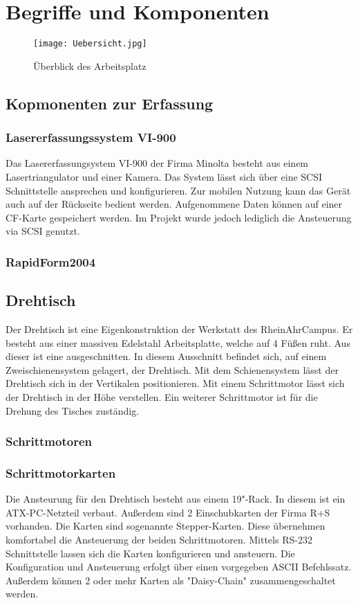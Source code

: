 \chapter{Begriffe und Komponenten}
\label{cha:Begriffe}
\begin{figure}[htb]
\centering
\texttt{[image: Uebersicht.jpg]}
\caption{Überblick des Arbeitsplatz}
\label{fig:Übersicht}
\end{figure}
\section{Kopmonenten zur Erfassung}
\subsection{Lasererfassungssystem VI-900}
Das Lasererfassungsystem VI-900 der Firma Minolta besteht aus einem Lasertriangulator und einer Kamera. Das System lässt sich über eine SCSI Schnittstelle ansprechen und konfigurieren. Zur mobilen Nutzung kann das Gerät auch auf der Rückseite bedient werden. Aufgenommene Daten können auf einer CF-Karte gespeichert werden. Im Projekt wurde jedoch lediglich die Ansteuerung via SCSI genutzt.
\subsection{RapidForm2004}

\section{Drehtisch}
Der Drehtisch ist eine Eigenkonstruktion der Werkstatt des RheinAhrCampus. Er besteht aus einer massiven Edelstahl Arbeitsplatte, welche auf 4 Füßen ruht. Aus dieser ist eine  ausgeschnitten. In diesem Ausschnitt befindet sich, auf einem Zweischienensystem gelagert, der Drehtisch. Mit dem Schienensystem lässt der Drehtisch sich in der Vertikalen positionieren. Mit einem Schrittmotor lässt sich der Drehtisch in der Höhe verstellen. Ein weiterer Schrittmotor ist für die Drehung des Tisches zuständig.   
\subsection{Schrittmotoren}
\subsection{Schrittmotorkarten}
Die Ansteurung für den Drehtisch besteht aus einem 19"-Rack. In diesem ist ein ATX-PC-Netzteil verbaut. Außerdem sind 2 Einschubkarten der Firma R+S vorhanden. Die Karten sind sogenannte Stepper-Karten. Diese übernehmen komfortabel die Ansteuerung der beiden Schrittmotoren. Mittels RS-232 Schnittstelle lassen sich die Karten konfigurieren und ansteuern. Die Konfiguration und Ansteuerung erfolgt über einen vorgegeben ASCII Befehlssatz. Außerdem können 2 oder mehr Karten als "Daisy-Chain" zusammengeschaltet werden. 
